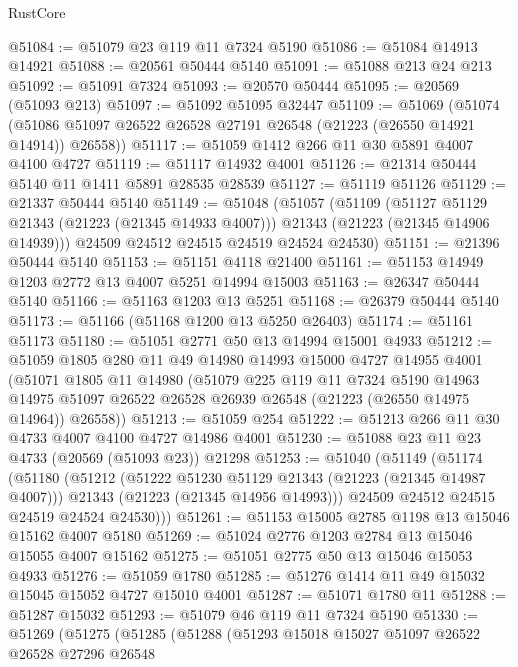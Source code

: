 \begin{lexlean}{RustCore}
\begin{coremodule}
@51084 := @51079 @23 @119 @11 @7324 @5190
@51086 := @51084 @14913 @14921
@51088 := @20561 @50444 @5140
@51091 := @51088 @213 @24 @213
@51092 := @51091 @7324
@51093 := @20570 @50444
@51095 := @20569 (@51093 @213)
@51097 := @51092 @51095 @32447
@51109 := @51069
    (@51074 (@51086 @51097 @26522 @26528 @27191 @26548 (@21223 (@26550 @14921 @14914)) @26558))
@51117 := @51059 @1412 @266 @11 @30 @5891 @4007 @4100 @4727
@51119 := @51117 @14932 @4001
@51126 := @21314 @50444 @5140 @11 @1411 @5891 @28535 @28539
@51127 := @51119 @51126
@51129 := @21337 @50444 @5140
@51149 := @51048
    (@51057
      (@51109
        (@51127 @51129 @21343 (@21223 (@21345 @14933 @4007)))
        @21343
        (@21223 (@21345 @14906 @14939)))
      @24509
      @24512
      @24515
      @24519
      @24524
      @24530)
@51151 := @21396 @50444 @5140
@51153 := @51151 @4118 @21400
@51161 := @51153 @14949 @1203 @2772 @13 @4007 @5251 @14994 @15003
@51163 := @26347 @50444 @5140
@51166 := @51163 @1203 @13 @5251
@51168 := @26379 @50444 @5140
@51173 := @51166 (@51168 @1200 @13 @5250 @26403)
@51174 := @51161 @51173
@51180 := @51051 @2771 @50 @13 @14994 @15001 @4933
@51212 := @51059
    @1805
    @280
    @11
    @49
    @14980
    @14993
    @15000
    @4727
    @14955
    @4001
    (@51071
      @1805
      @11
      @14980
      (@51079
        @225
        @119
        @11
        @7324
        @5190
        @14963
        @14975
        @51097
        @26522
        @26528
        @26939
        @26548
        (@21223 (@26550 @14975 @14964))
        @26558))
@51213 := @51059 @254
@51222 := @51213 @266 @11 @30 @4733 @4007 @4100 @4727 @14986 @4001
@51230 := @51088 @23 @11 @23 @4733 (@20569 (@51093 @23)) @21298
@51253 := @51040
    (@51149
      (@51174
        (@51180
          (@51212
            (@51222 @51230 @51129 @21343 (@21223 (@21345 @14987 @4007)))
            @21343
            (@21223 (@21345 @14956 @14993)))
          @24509
          @24512
          @24515
          @24519
          @24524
          @24530)))
@51261 := @51153 @15005 @2785 @1198 @13 @15046 @15162 @4007 @5180
@51269 := @51024 @2776 @1203 @2784 @13 @15046 @15055 @4007 @15162
@51275 := @51051 @2775 @50 @13 @15046 @15053 @4933
@51276 := @51059 @1780
@51285 := @51276 @1414 @11 @49 @15032 @15045 @15052 @4727 @15010 @4001
@51287 := @51071 @1780 @11
@51288 := @51287 @15032
@51293 := @51079 @46 @119 @11 @7324 @5190
@51330 := @51269
    (@51275
      (@51285
        (@51288
          (@51293
            @15018
            @15027
            @51097
            @26522
            @26528
            @27296
            @26548

\end{coremodule}
\end{lexlean}
